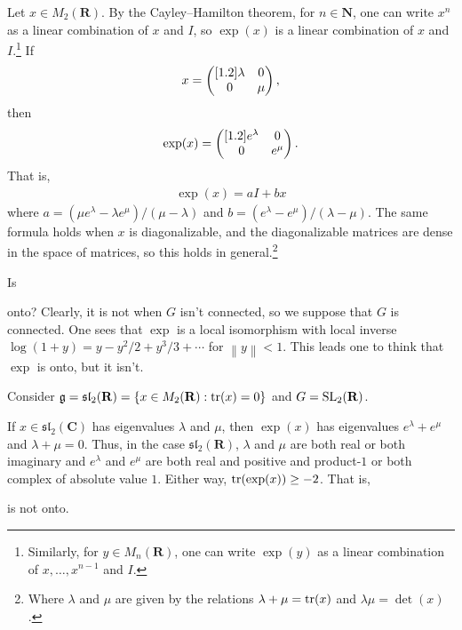 \documentclass [11 pt, twoside] {article}
\begin{document}
Let $x\in M_{2}(\mathbf{R})$. 
By the Cayley--Hamilton theorem, for $n\in \mathbf{N}$, one can write $x^{n}$ as a linear combination of $x$ and $I$, so $\exp(x)$ is a linear combination of $x$ and $I$.\footnote{Similarly, for $y\in M_{n}(\mathbf{R})$, one can write $\exp(y)$ as a linear combination of $x,\hdots,x^{n-1}$ and $I$.}
If
\begin{align*}
	x = \begin{pmatrix} [1.2] \lambda&0\\0&\mu\end{pmatrix},
\end{align*}
then 
\begin{align*}
	\exp(x) = \begin{pmatrix} [1.2] e ^{\lambda} &0\\ 0&e^{\mu}\end{pmatrix}.
\end{align*}
That is, 
\begin{align*}
	\exp(x) = a I + b x
\end{align*}
where $a = (\mu e^{\lambda} - \lambda e^{\mu}) /(\mu-\lambda)$ and $b = (e^{\lambda}-e^{\mu})/(\lambda-\mu)$.
The same formula holds when $x$ is diagonalizable, and the diagonalizable matrices are dense in the space of matrices, so this holds in general.\footnote{Where $\lambda$ and $\mu$ are given by the relations $\lambda+\mu = \operatorname{tr}(x)$ and $\lambda\mu = \det(x)$.}

Is 
onto? Clearly, it is not when $G$ isn't connected, so we suppose that $G$ is connected. One sees that $\exp$ is a local isomorphism with local inverse $\log (1+y) = y - y ^{2}/2 + y^{3}/3+\cdots$ for $\left\lVert y \right\rVert <1$.
This leads one to think that $\exp$ is onto, but it isn't.

\begin{example}[ ]\label{}\text{}
Consider $\mathfrak{g} = \mathfrak{sl}_{2}(\mathbf{R}) = \{x\in M_{2}(\mathbf{R}): \operatorname{tr}(x)=0\}$ and $G=\operatorname{SL}_{2}(\mathbf{R})$.

If $x\in\mathfrak{sl}_{2}(\mathbf{C})$ has eigenvalues $\lambda$ and $\mu$, then $\exp(x)$ has eigenvalues $e^{\lambda} + e^{\mu}$ and $\lambda+\mu=0$. 
Thus, in the case $\mathfrak{sl}_{2}(\mathbf{R})$, $\lambda$ and $\mu$ are both real or both imaginary and $e^{\lambda}$ and $e^{\mu}$ are both real and positive and product-$1$ or both complex of absolute value $1$.
Either way, $\operatorname{tr}(\exp(x)) \ge -2$. That is, 
is not onto.
\end{example}
\end{document}
